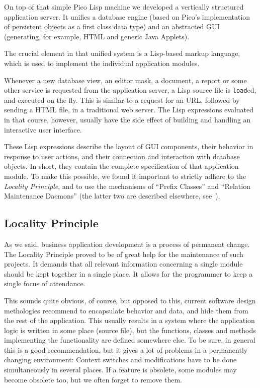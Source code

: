 On top of that simple Pico Lisp machine we developed a vertically structured
application server. It unifies a database engine (based on Pico's implementation
of persistent objects as a first class data type) and an abstracted GUI
(generating, for example, HTML and generic Java Applets).

The crucial element in that unified system is a Lisp-based markup language,
which is used to implement the individual application modules.

Whenever a new database view, an editor mask, a document, a report or some other
service is requested from the application server, a Lisp source file is
\texttt{load}ed, and executed on the fly. This is similar to a request for an
URL, followed by sending a HTML file, in a traditional web server. The Lisp
expressions evaluated in that course, however, usually have the side effect of
building and handling an interactive user interface.

These Lisp expressions describe the layout of GUI components, their behavior in
response to user actions, and their connection and interaction with database
objects. In short, they contain the complete specification of that application
module. To make this possible, we found it important to strictly adhere to the
\emph{Locality Principle}, and to use the mechanisms of ``Prefix Classes'' and
``Relation Maintenance Daemons'' (the latter two are described elsewhere,
see~\cite{ul}).


\subsection{Locality Principle}
\label{sec:rad-locality-principle}

As we said, business application development is a process of permanent change.
The Locality Principle proved to be of great help for the maintenance of such
projects. It demands that all relevant information concerning a single module
should be kept together in a single place. It allows for the programmer to keep
a single focus of attendance.

This sounds quite obvious, of course, but opposed to this, current software
design methologies recommend to encapsulate behavior and data, and hide them
from the rest of the application. This usually results in a system where the
application logic is written in some place (source file), but the functions,
classes and methods implementing the functionality are defined somewhere else.
To be sure, in general this is a good recommendation, but it gives a lot of
problems in a permanently changing environment: Context switches and
modifications have to be done simultaneously in several places. If a feature is
obsolete, some modules may become obsolete too, but we often forget to remove
them.

